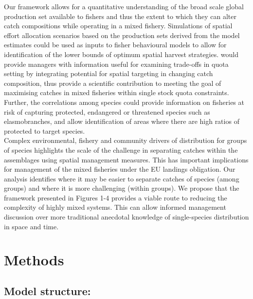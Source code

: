 \documentclass[fleqn,10pt]{wlscirep}
\begin{document}
\begin{linenumbers}
Our framework allows for a quantitative understanding of the broad scale global
production set available to fishers\cite{Reimer2017} and thus the extent to
which they can alter catch compositions while operating in a mixed fishery.
Simulations of spatial effort allocation scenarios based on the production sets
derived from the model estimates could be used as inputs to fisher behavioural
models to allow for identification of the lower bounds of optimum spatial
harvest strategies.  would provide managers with
information useful for examining trade-offs in quota setting by integrating
potential for spatial targeting in changing catch composition, thus provide a
scientific contribution to  meeting the goal of maximising catches in mixed fisheries
within single stock quota constraints\cite{Ulrich2016}. Further, the
correlations among species could provide information on fisheries at risk of
capturing protected, endangered or threatened species such as elasmobranches,
and allow identification of areas where there are high ratios of protected to
target species.\\


Complex environmental, fishery and community drivers of distribution for groups
of species highlights the scale of the challenge in separating catches within
the assemblages using spatial management measures. This has important
implications for management of the mixed fisheries under the EU landings
obligation. Our analysis identifies where it may be easier to separate catches
of species (among groups) and where it is more challenging (within groups). We
propose that the framework presented in Figures 1-4 provides a viable route to
reducing the complexity of highly mixed systems.  This can allow informed
management discussion over more traditional anecdotal knowledge of
single-species distribution in space and time.\\


\section*{Methods\\}

\subsection*{Model structure:\\} 


\end{linenumbers}
\end{document}

